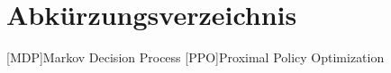 \chapter*{Abkürzungsverzeichnis}

\begin{acronym}[PPO] %

	[MDP]{Markov Decision Process}
	[PPO]{Proximal Policy Optimization}

\end{acronym}